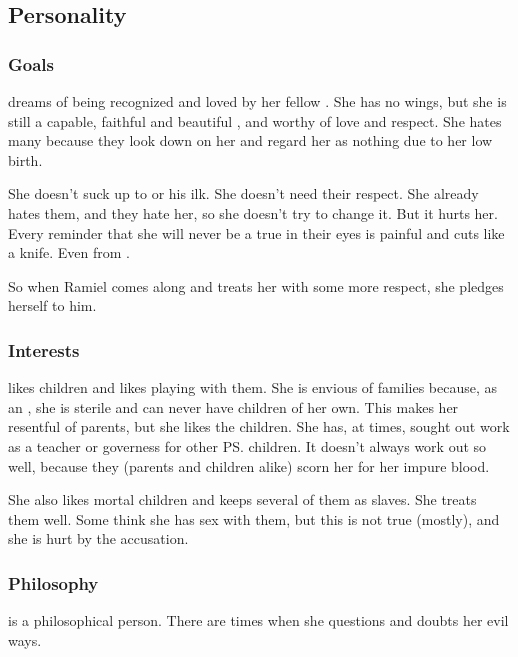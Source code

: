 \subsection{Personality}





\subsubsection{Goals}
\Achsah{} dreams of being recognized and loved by her fellow \resphain. 
She has no wings, but she is still a capable, faithful and beautiful \resvil, and worthy of love and respect. 
She hates many \resphain{} because they look down on her and regard her as nothing due to her low birth. 

She doesn't suck up to \Teshrial{} or his ilk. 
She doesn't need their respect. 
She already hates them, and they hate her, so she doesn't try to change it. 
But it hurts her. 
Every reminder that she will never be a true \resvil{} in their eyes is painful and cuts like a knife. 
Even from \Teshrial. 

So when Ramiel comes along and treats her with some more respect, she pledges herself to him. 





\subsubsection{Interests}
\Achsah{} likes children and likes playing with them. 
She is envious of families because, as an \ashenblood, she is sterile and can never have children of her own. 
This makes her resentful of parents, but she likes the children. 
She has, at times, sought out work as a teacher or governess for other \ps{\resphain}{} children. 
It doesn't always work out so well, because they (parents and children alike) scorn her for her impure blood. 

She also likes mortal children and keeps several of them as slaves. 
She treats them well. 
Some think she has sex with them, but this is not true (mostly), and she is hurt by the accusation. 





\subsubsection{Philosophy}
\Achsah{} is a philosophical person. 
There are times when she questions and doubts her evil ways.


